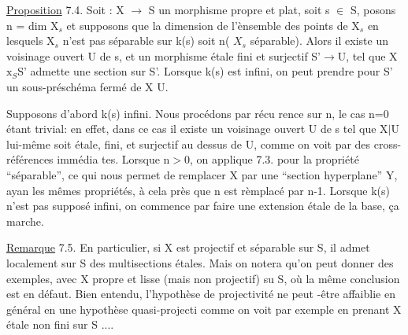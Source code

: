 





\uline{Proposition} 7.4. Soit : X $\longrightarrow$ S un morphisme propre et plat, 
soit s $\in$ S,  posons n = dim X$_{s}$ et supposons que la dimension de
l'ènsemble des points de X$_{s}$ en lesquels X$_{s}$ n'est pas séparable sur k(s)
soit \hand{$<$} n( $X_s$ séparable). Alors il existe un voisinage ouvert U de s, et un morphisme
étale fini et surjectif S'$\longrightarrow$U, tel que X$\mathrm{x}_{S}$S' admette une section sur S'.
Lorsque k(s) est infini, on peut prendre pour S' un sous-préschéma fermé
de X U.

Supposons d'abord k(s) infini. Nous  procédons par récu%
rence sur n, le cas n=0 étant trivial: en effet, dans ce cas il existe
un voisinage ouvert U de s tel que X$|$U lui-même soit étale, fini, et
surjectif au dessus de U, comme on voit par des cross-références immédia
tes. Lorsque n$>$0, on applique 7.3. pour la propriété ``séparable'', ce qui
nous permet de  remplacer X par une ``section hyperplane'' Y, ayan
les mêmes propriétés, à cela près que n est rèmplacé par n-1. Lorsque
k(s) n'est pas supposé infini, on commence par faire une extension étale
de la base, ça marche.

\uline{Remarque} 7.5. En particulier, si X est projectif et séparable sur S,
il admet localement sur S des multisections étales. Mais on notera qu'on
peut donner des exemples, avec X propre et lisse (mais non projectif) su
S, où la même conclusion est en défaut. Bien entendu, l'hypothèse de
 projectivité ne peut -être affaiblie en général en une hypothèse quasi-projecti
comme on voit par exemple en prenant X étale non fini sur S ....


